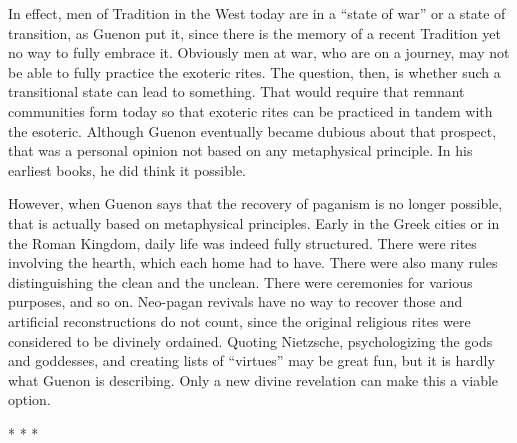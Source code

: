 In effect, men of Tradition in the West today are in a ``state of war'' or a state of transition, as Guenon put it, since there is the memory of a recent Tradition yet no way to fully embrace it. Obviously men at war, who are on a journey, may not be able to fully practice the exoteric rites. The question, then, is whether such a transitional state can lead to something. That would require that remnant communities form today so that exoteric rites can be practiced in tandem with the esoteric. Although Guenon eventually became dubious about that prospect, that was a personal opinion not based on any metaphysical principle. In his earliest books, he did think it possible.

However, when Guenon says that the recovery of paganism is no longer possible, that is actually based on metaphysical principles. Early in the Greek cities or in the Roman Kingdom, daily life was indeed fully structured. There were rites involving the hearth, which each home had to have. There were also many rules distinguishing the clean and the unclean. There were ceremonies for various purposes, and so on. Neo-pagan revivals have no way to recover those and artificial reconstructions do not count, since the original religious rites were considered to be divinely ordained. Quoting Nietzsche, psychologizing the gods and goddesses, and creating lists of ``virtues'' may be great fun, but it is hardly what Guenon is describing. Only a new divine revelation can make this a viable option.



\begin{center}* * *\end{center}

